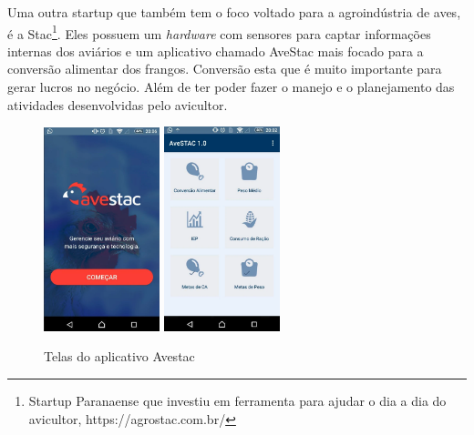 Uma outra startup que também tem o foco voltado para a agroindústria de aves, é a Stac\footnote{Startup Paranaense que investiu em ferramenta para ajudar o dia a dia do avicultor, https://agrostac.com.br/}. Eles possuem um \textit{hardware} com sensores para captar informações internas dos aviários e um aplicativo chamado AveStac mais focado para a conversão alimentar dos frangos. Conversão esta que é muito importante para gerar lucros no negócio. Além de ter poder fazer o manejo e o planejamento das atividades desenvolvidas pelo avicultor.                                                          \begin{figure}[h]
    \centering
    \caption{Telas do aplicativo Avestac}
    \includegraphics[width=0.3\textwidth]{./dados/figuras/avestac1.png}
    \includegraphics[width=0.3\textwidth]{./dados/figuras/avestac2.png}
    \label{fig:p1}
\end{figure}                                                                       




